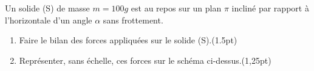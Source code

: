 \documentclass[12pt]{article}
\begin{document}

Un solide (S) de masse $m=100g$ est au repos sur un plan $\pi$ incliné par rapport à l’horizontale d’un angle $\alpha$ sans frottement.
\begin{enumerate}
	\item Faire le bilan des forces appliquées sur le solide (S).\dotfill(1.5pt)
	\item Représenter, sans échelle, ces forces sur le schéma ci-dessus.\dotfill(1,25pt)
\end{enumerate}
\end{document}
